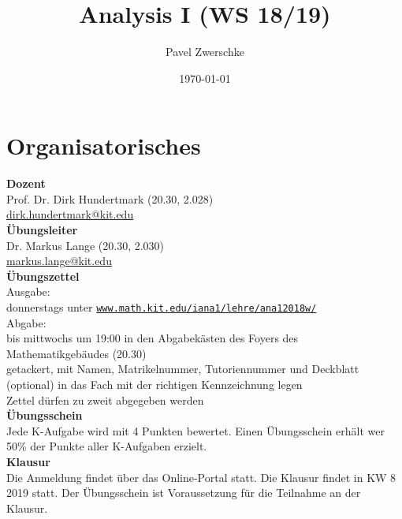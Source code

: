 \documentclass[12pt,a4paper,titlepage]{article} %
\theoremstyle{definition}
\theoremstyle{remark}
\begin{document}
\title{Analysis I (WS 18/19)}
\date{\today}
\author{Pavel Zwerschke}
\maketitle

\tableofcontents
\newpage

\setcounter{section}{-1}
\section{Organisatorisches}
\textbf{Dozent}\\
Prof. Dr. Dirk Hundertmark (20.30, 2.028)\\
\href{mailto:dirk.hundertmark@kit.edu}{dirk.hundertmark@kit.edu}\\
\textbf{Übungsleiter}\\
Dr. Markus Lange (20.30, 2.030)\\
\href{mailto:markus.lange@kit.edu}{markus.lange@kit.edu}\\
\textbf{Übungszettel}\\
Ausgabe:\\
donnerstags unter \href{http://www.math.kit.edu/iana1/lehre/ana12018w/}{\texttt{www.math.kit.edu/iana1/lehre/ana12018w/}}\\
Abgabe:\\
bis mittwochs um 19:00 in den Abgabekästen des Foyers des Mathematikgebäudes (20.30)\\
getackert, mit Namen, Matrikelnummer, Tutoriennummer und Deckblatt (optional) in das Fach mit der richtigen Kennzeichnung legen\\
Zettel dürfen zu zweit abgegeben werden\\
\textbf{Übungsschein}\\
Jede K-Aufgabe wird mit 4 Punkten bewertet. Einen Übungsschein erhält wer 50\% der Punkte aller K-Aufgaben erzielt.\\
\textbf{Klausur}\\
Die Anmeldung findet über das Online-Portal statt. Die Klausur findet in KW 8 2019 statt. Der Übungsschein ist Voraussetzung für die Teilnahme an der Klausur.

\newpage
\end{document}
